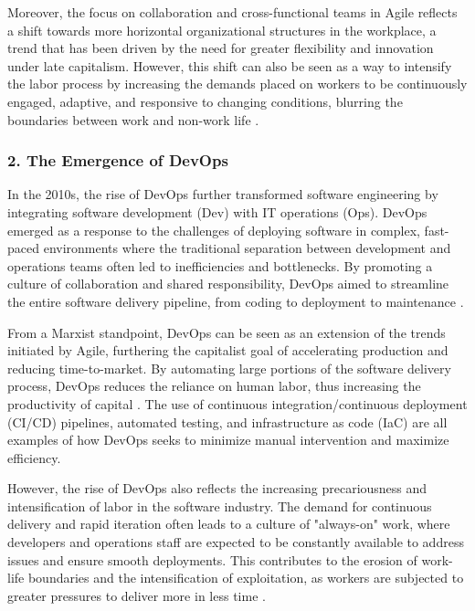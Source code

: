 \begin{refsection}
\begin{multicols}{2}
{Moreover, the focus on collaboration and cross-functional teams in Agile reflects a shift towards more horizontal organizational structures in the workplace, a trend that has been driven by the need for greater flexibility and innovation under late capitalism. However, this shift can also be seen as a way to intensify the labor process by increasing the demands placed on workers to be continuously engaged, adaptive, and responsive to changing conditions, blurring the boundaries between work and non-work life \cite{scholz2013digital}.

\subsubsection*{2. The Emergence of DevOps}

In the 2010s, the rise of DevOps further transformed software engineering by integrating software development (Dev) with IT operations (Ops). DevOps emerged as a response to the challenges of deploying software in complex, fast-paced environments where the traditional separation between development and operations teams often led to inefficiencies and bottlenecks. By promoting a culture of collaboration and shared responsibility, DevOps aimed to streamline the entire software delivery pipeline, from coding to deployment to maintenance \cite{humble2010continuous}.

From a Marxist standpoint, DevOps can be seen as an extension of the trends initiated by Agile, furthering the capitalist goal of accelerating production and reducing time-to-market. By automating large portions of the software delivery process, DevOps reduces the reliance on human labor, thus increasing the productivity of capital \cite{marx1867capital}. The use of continuous integration/continuous deployment (CI/CD) pipelines, automated testing, and infrastructure as code (IaC) are all examples of how DevOps seeks to minimize manual intervention and maximize efficiency.

However, the rise of DevOps also reflects the increasing precariousness and intensification of labor in the software industry. The demand for continuous delivery and rapid iteration often leads to a culture of "always-on" work, where developers and operations staff are expected to be constantly available to address issues and ensure smooth deployments. This contributes to the erosion of work-life boundaries and the intensification of exploitation, as workers are subjected to greater pressures to deliver more in less time \cite{harvey2010enigma}.

}
\end{multicols}
\end{refsection}
